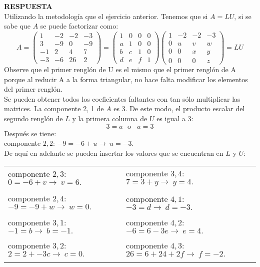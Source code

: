 \documentclass[11pt,letterpaper]{article}
\newcommand{\res}{\textbf{RESPUESTA}\\}
\begin{document}
\begin{enumerate}
\res 
Utilizando la metodología que el ejercicio anterior. Tenemos que si $A=LU$, si se sabe que $A$ se puede factorizar como:
\begin{equation*}
A=\left(\begin{array}{rrrr}
 1 & -2 & -2 &-3\\
 3 & -9 &  0 &-9\\
-1 &  2 &  4 & 7\\
-3 & -6 & 26 & 2
\end{array} \right)=
\left(\begin{array}{rrrr}
 1 &  0 &  0 & 0\\
 a &  1 &  0 & 0\\
 b &  c &  1 & 0\\
 d &  e &  f & 1
\end{array} \right) \left(\begin{array}{rrrr}
 1 & -2 & -2 & -3\\
 0 &  u &  v &  w\\
 0 &  0 &  x &  y\\
 0 &  0 &  0 &  z
\end{array} \right)=LU
\end{equation*}
Observe que el primer renglón de U es el mismo que el primer renglón de A porque al reducir A a la forma triangular, no hace falta modificar los elementos del primer renglón.\\
Se pueden obtener todos los coeficientes faltantes con tan sólo multiplicar las matrices. La
componente 2, 1 de $A$ es 3. De este modo, el producto escalar del segundo renglón de $L$ y la primera columna de $U$ es igual a 3:
$$3=a \ \ \ \text{o}  \ \ \ \ a=3$$
Después se tiene:\\
componente $2,2$: $-9=-6+u \rightarrow \ u=-3.$\\
De aquí en adelante se pueden insertar los valores que se encuentran en $L$ y $U$:
\begin{table}[H]
\centering
\begin{tabular}{l|l}
componente $2,3$: $0=-6+v \rightarrow \ v=6.$ & componente $3,4$: $7=3+y \rightarrow \ y=4.$\\ \\
componente $2,4$: $-9=-9+w \rightarrow \ w=0.$ & componente $4,1$: $-3=d \rightarrow \ d=-3.$\\ \\
componente $3,1$: $-1=b \rightarrow \ b=-1.$ & componente $4,2$: $-6=6-3e \rightarrow \ e=4.$\\ \\
componente $3,2$: $2=2+-3c \rightarrow \ c=0.$ & componente $4,3$: $26=6+24+2f \rightarrow \ f=-2.$\\ \\

\end{tabular}
\end{table}
\end{enumerate}
\end{document}
